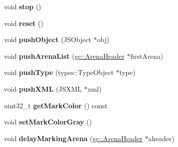 \begin{DoxyCompactItemize}
\item 
\hypertarget{structjs_1_1_g_c_marker_a0bc574aa1e175dcd583b7eac9d8ae817}{void {\bfseries stop} ()}\label{structjs_1_1_g_c_marker_a0bc574aa1e175dcd583b7eac9d8ae817}

\item 
\hypertarget{structjs_1_1_g_c_marker_aff477b64607c79a837e56e1f3c80a001}{void {\bfseries reset} ()}\label{structjs_1_1_g_c_marker_aff477b64607c79a837e56e1f3c80a001}

\item 
\hypertarget{structjs_1_1_g_c_marker_a077dcf7b9a9c2732790d250fc633b82c}{void {\bfseries push\-Object} (J\-S\-Object $\ast$obj)}\label{structjs_1_1_g_c_marker_a077dcf7b9a9c2732790d250fc633b82c}

\item 
\hypertarget{structjs_1_1_g_c_marker_ab2ead1d9fa2864f6bae3eb1662b50672}{void {\bfseries push\-Arena\-List} (\hyperlink{structjs_1_1gc_1_1_arena_header}{gc\-::\-Arena\-Header} $\ast$first\-Arena)}\label{structjs_1_1_g_c_marker_ab2ead1d9fa2864f6bae3eb1662b50672}

\item 
\hypertarget{structjs_1_1_g_c_marker_a855c3d820c8456002a2a6fda0f9aa38c}{void {\bfseries push\-Type} (types\-::\-Type\-Object $\ast$type)}\label{structjs_1_1_g_c_marker_a855c3d820c8456002a2a6fda0f9aa38c}

\item 
\hypertarget{structjs_1_1_g_c_marker_a9941671c7d3635f9ae99f7470d79093a}{void {\bfseries push\-X\-M\-L} (J\-S\-X\-M\-L $\ast$xml)}\label{structjs_1_1_g_c_marker_a9941671c7d3635f9ae99f7470d79093a}

\item 
\hypertarget{structjs_1_1_g_c_marker_ac05597bfc32c7776e556b7ccbae80d7a}{uint32\-\_\-t {\bfseries get\-Mark\-Color} () const }\label{structjs_1_1_g_c_marker_ac05597bfc32c7776e556b7ccbae80d7a}

\item 
\hypertarget{structjs_1_1_g_c_marker_aa1d957ccfb38ef4d32ce4f56b7317f4d}{void {\bfseries set\-Mark\-Color\-Gray} ()}\label{structjs_1_1_g_c_marker_aa1d957ccfb38ef4d32ce4f56b7317f4d}

\item 
\hypertarget{structjs_1_1_g_c_marker_a654c4a1f4e616ba611f75fcaac6d61e7}{void {\bfseries delay\-Marking\-Arena} (\hyperlink{structjs_1_1gc_1_1_arena_header}{gc\-::\-Arena\-Header} $\ast$aheader)}\label{structjs_1_1_g_c_marker_a654c4a1f4e616ba611f75fcaac6d61e7}


\end{DoxyCompactItemize}
